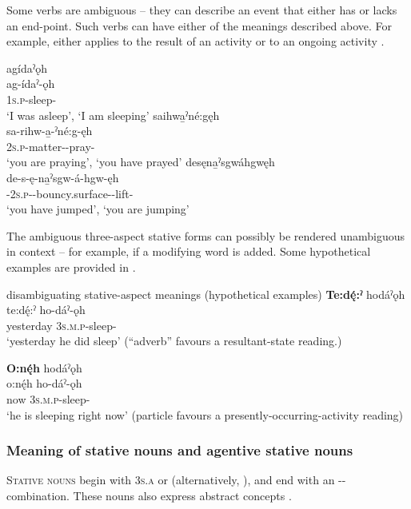 Some verbs are ambiguous -- they can describe an event that either has or lacks an end-point. Such verbs can have either of the meanings described above. For example,  either applies to the result of an activity or to an ongoing activity .

\ea\label{ex:stataspectex6}
\ea agídaˀǫh \\\label{ex:stataspectex6a}
\gll ag-ídaˀ-ǫh\\
 \textsc{1s.p}-sleep-{\stative}\\
\glt ‘I was asleep’, `I am sleeping'
\ex saihwa̱ˀné:gęh \\\label{ex:stataspectex6b}
\gll sa-rihw-a̱-ˀné:g-ęh\\
 \textsc{2s.p}-matter-{\joinerA}-pray-{\stative}\\
\glt ‘you are praying’, `you have prayed'
\ex desęna̱ˀsgwáhgwęh \\\label{ex:stataspectex6c}
\gll de-s-ę-na̱ˀsgw-á-hgw-ęh\\
 {\dualic}-\textsc{2s.p}-{\semireflexive}-bouncy.surface-{\joinerA}-lift-{\stative}\\
\glt ‘you have jumped’, `you are jumping'
\z
\z

The ambiguous three-aspect stative forms can possibly be rendered unambiguous in context -- for example, if a modifying word is added. Some hypothetical examples are provided in .

\ea\label{ex:stataspectex7} disambiguating stative-aspect meanings (hypothetical examples)
\ea \textbf{Te:dę́:ˀ} hodáˀǫh \\\label{ex:stataspectex7a}
te:dę́:ˀ ho-dáˀ-ǫh\\
yesterday \textsc{3s.m.p}-sleep-{\stative}\\
\glt ‘yesterday he did sleep’ (“adverb”  favours a resultant-state reading.)  

\ex \textbf{O:nę́h} hodáˀǫh \\\label{ex:stataspectex7b}
\gll o:nę́h ho-dáˀ-ǫh\\
now \textsc{3s.m.p}-sleep-{\stative} \\
\glt ‘he is sleeping right now’ (particle  favours a presently-occurring-activity reading)
\z
\z

\subsubsection{Meaning of stative nouns and agentive stative nouns} \label{Meaning of stative nouns and agentive stative nouns}
\textsc{Stative nouns} begin with  \textsc{3s.a} or   (alternatively, ), and end with an  {\stative}-{\length}-\exsc{\nsf} combination. These nouns also express abstract concepts .

